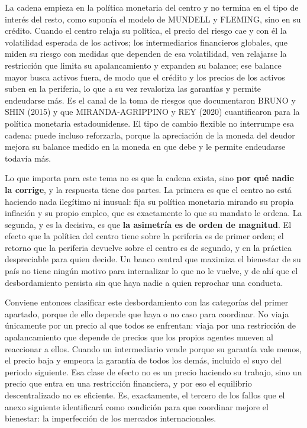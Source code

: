 \documentclass[10pt,a4paper]{article}
\newcounter{anexo}
\begin{document}
La cadena empieza en la política monetaria del centro y no termina en el tipo de interés del resto, como suponía el modelo de MUNDELL y FLEMING, sino en su crédito. Cuando el centro relaja su política, el precio del riesgo cae y con él la volatilidad esperada de los activos; los intermediarios financieros globales, que miden su riesgo con medidas que dependen de esa volatilidad, ven relajarse la restricción que limita su apalancamiento y expanden su balance; ese balance mayor busca activos fuera, de modo que el crédito y los precios de los activos suben en la periferia, lo que a su vez revaloriza las garantías y permite endeudarse más. Es el canal de la toma de riesgos que documentaron BRUNO y SHIN (2015) y que MIRANDA-AGRIPPINO y REY (2020) cuantificaron para la política monetaria estadounidense. El tipo de cambio flexible no interrumpe esa cadena: puede incluso reforzarla, porque la apreciación de la moneda del deudor mejora su balance medido en la moneda en que debe y le permite endeudarse todavía más.

Lo que importa para este tema no es que la cadena exista, sino \textbf{por qué nadie la corrige}, y la respuesta tiene dos partes. La primera es que el centro no está haciendo nada ilegítimo ni inusual: fija su política monetaria mirando su propia inflación y su propio empleo, que es exactamente lo que su mandato le ordena. La segunda, y es la decisiva, es que \textbf{la asimetría es de orden de magnitud}. El efecto que la política del centro tiene sobre la periferia es de primer orden; el retorno que la periferia devuelve sobre el centro es de segundo, y en la práctica despreciable para quien decide. Un banco central que maximiza el bienestar de su país no tiene ningún motivo para internalizar lo que no le vuelve, y de ahí que el desbordamiento persista sin que haya nadie a quien reprochar una conducta.

Conviene entonces clasificar este desbordamiento con las categorías del primer apartado, porque de ello depende que haya o no caso para coordinar. No viaja únicamente por un precio al que todos se enfrentan: viaja por una restricción de apalancamiento que depende de precios que los propios agentes mueven al reaccionar a ellos. Cuando un intermediario vende porque su garantía vale menos, el precio baja y empeora la garantía de todos los demás, incluido el suyo del periodo siguiente. Esa clase de efecto no es un precio haciendo su trabajo, sino un precio que entra en una restricción financiera, y por eso el equilibrio descentralizado no es eficiente. Es, exactamente, el tercero de los fallos que el anexo siguiente identificará como condición para que coordinar mejore el bienestar: la imperfección de los mercados internacionales.
\end{document}
